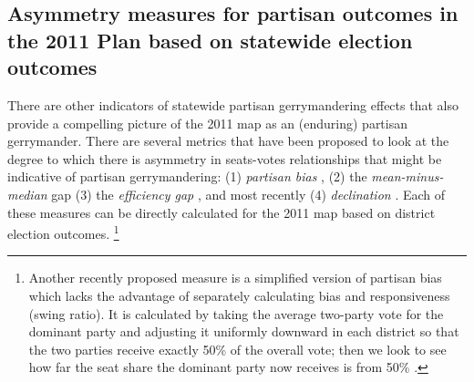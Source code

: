        \subsection*{Asymmetry measures for partisan outcomes in the 2011 Plan based on statewide election outcomes}
%
    There are other indicators of statewide partisan gerrymandering effects that also provide a compelling picture of the 2011 map as an (enduring) partisan gerrymander. There are several metrics that have been proposed to look at the degree to which there is asymmetry in seats-votes relationships that might be indicative of partisan gerrymandering: (1) \textit{partisan bias} \citep{Tufte1973}, (2) the \textit{mean-minus-median} gap \citep{Mcdonald_Best_2015_ELJ} (3) the \textit{efficiency gap} \citep{Stephanopoulos2014_UofChicagoLaw}, and most recently (4) \textit{declination} \citep{Warrington2018}. Each of these measures can be directly calculated for the 2011 map based on district election outcomes. 
        \footnote{Another recently proposed measure is a simplified version of partisan bias which lacks the advantage of separately calculating bias and responsiveness (swing ratio). It is calculated by taking the average two-party vote for the dominant party and adjusting it uniformly downward in each district so that the two parties receive exactly 50\% of the overall vote; then we look to see how far the seat share the dominant party now receives is from 50\% \citep{Wang2016_SLR}.}
\par

